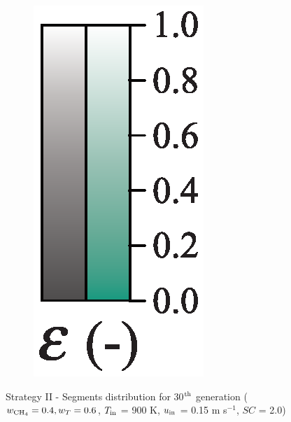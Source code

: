 \documentclass[preprint,12pt]{elsarticle}
\begin{document}
\begin{figure}[h!]
\begin{subfigure}[b]{0.1\textwidth}
     	\includegraphics[width=\textwidth]{segments_porosity.eps}
     \end{subfigure}
\caption{\label{fig:30L6040G1-TField} Strategy II - Segments distribution for 30$^{\rm{th}}$ generation ($w_{\rm{CH_4}} = 0.4, w_T = 0.6$, $T_{\rm{in}}$ = 900 K, $u_{\rm{in}}$ = 0.15 m s$^{-1}$, $SC$ = 2.0)}
\end{figure}
\end{document}
